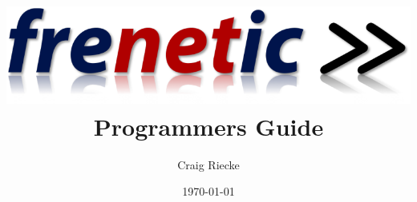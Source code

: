 \documentclass[12pt]{report}
\begin{document}
\title{\includegraphics{frenetic-logo.png}\\Programmers Guide}

\author{\Large Craig Riecke\\[3ex]}
\date{\LARGE {} \fi  \today}

\maketitle

\tableofcontents{}

















\end{document}

